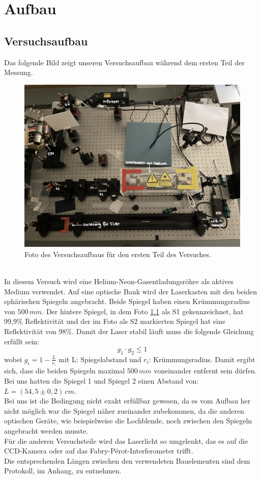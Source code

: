 \chapter{Aufbau}
\section{Versuchsaufbau}
Das folgende Bild zeigt unseren Versuchsaufbau während dem ersten Teil der Messung.
\begin{figure}[h]
    \centering\includegraphics[scale=0.2]{Bilder/Aufbau.jpeg} 
    \caption{Foto des Versuchsaufbaus für den ersten Teil des Versuches.} 
    \label{fig:Aufbau}
\end{figure}\\
In diesem Versuch wird eine Helium-Neon-Gasentladungsröhre als aktives Medium verwendet. 
Auf eine optische Bank wird der Laserkasten mit den beiden sphärischen Spiegeln angebracht. 
Beide Spiegel haben einen Krümmungsradius von $500\,mm$. Der hintere Spiegel, in 
dem Foto \ref{fig:Aufbau} als S1 gekennzeichnet, hat 99,9\% Reflektivität und der im Foto 
als S2 markierten Spiegel hat eine Reflektivität von 98\%. 
Damit der Laser stabil läuft muss die folgende Gleichung erfüllt sein:
\begin{equation}
    g_1 \cdot g_2 \leq 1
\end{equation}
wobei $g_i = 1 - \frac{L}{r_i}$ mit L: Spiegelabstand und $r_i$: Krümmungsradius.
Damit ergibt sich, dass die beiden Spiegeln maximal $500\,mm$ voneinander entfernt sein dürfen.\\
Bei uns hatten die Spiegel 1 und Spiegel 2 einen Abstand von: $L = (54,5 \pm 0,2)\,cm$.\\
Bei uns ist die Bedingung nicht exakt erfüllbar gewesen, da es vom Aufbau her nicht möglich war die 
Spiegel näher zueinander zubekommen, da die anderen optischen Geräte, wie beispielweise die 
Lochblende, noch zwischen den Spiegeln angebracht werden musste. \\
Für die anderen Versuchsteile wird das Laserlicht so umgelenkt, das es auf die CCD-Kamera oder auf 
das Fabry-Pérot-Interferometer trifft. \\
Die entsprechenden Längen zwischen den verwendeten Bauelementen sind dem Protokoll, im Anhang, zu entnehmen. 

